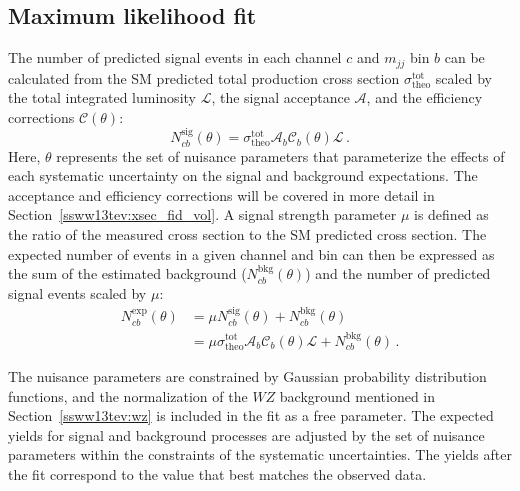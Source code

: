 \subsection{Maximum likelihood fit}\label{ssww13tev:xsec_fit_method}
The number of predicted signal events in each channel $c$ and $m_{jj}$ bin $b$ can be calculated from the SM predicted total production cross section $\sigma^{\textrm{tot}}_{\textrm{theo}}$ scaled by the total integrated luminosity $\mathcal{L}$, the signal acceptance $\mathcal{A}$, and the efficiency corrections $\mathcal{C}(\theta)$:
\begin{equation}
  N_{cb}^{\textrm{sig}}(\theta) = \sigma^{\textrm{tot}}_{\textrm{theo}}\mathcal{A}_b\mathcal{C}_{b}(\theta)\mathcal{L}\,.
  \label{eq:ssww13tev_xsec_nsig}
\end{equation}
Here, $\theta$ represents the set of nuisance parameters that parameterize the effects of each systematic uncertainty on the signal and background expectations.
The acceptance and efficiency corrections will be covered in more detail in Section~\ref{ssww13tev:xsec_fid_vol}.
A signal strength parameter $\mu$ is defined as the ratio of the measured cross section to the SM predicted cross section.
The expected number of events in a given channel and bin can then be expressed as the sum of the estimated background ($N_{cb}^{\textrm{bkg}}(\theta)$) and the number of predicted signal events scaled by $\mu$:
\begin{equation}
  \begin{aligned}
    N_{cb}^{\textrm{exp}}(\theta) &= \mu N_{cb}^{\textrm{sig}}(\theta) + N_{cb}^{\textrm{bkg}}(\theta) \\
                              &= \mu \sigma^{\textrm{tot}}_{\textrm{theo}}\mathcal{A}_b\mathcal{C}_{b}(\theta)\mathcal{L} + N_{cb}^{\textrm{bkg}}(\theta)\,.
  \end{aligned}
  \label{eq:ssww13tev_xsec_nexp}
\end{equation}

The nuisance parameters are constrained by Gaussian probability distribution functions, and the normalization of the $WZ$ background mentioned in Section~\ref{ssww13tev:wz} is included in the fit as a free parameter.
The expected yields for signal and background processes are adjusted by the set of nuisance parameters within the constraints of the systematic uncertainties.
The yields after the fit correspond to the value that best matches the observed data.

